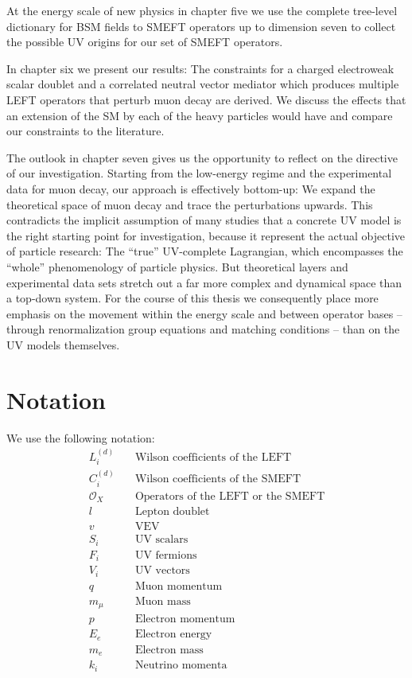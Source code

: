 At the energy scale of new physics in chapter five we use the complete tree-level dictionary for BSM fields to SMEFT operators up to dimension seven to collect the possible UV origins for our set of SMEFT operators. 

In chapter six we present our results: The constraints for a charged electroweak scalar doublet and a correlated neutral vector mediator which produces multiple LEFT operators that perturb muon decay are derived. We discuss the effects that an extension of the SM by each of the heavy particles would have and compare our constraints to the literature.

The outlook in chapter seven gives us the opportunity to reflect on the directive of our investigation. Starting from the low-energy regime and the experimental data for muon decay, our approach is effectively bottom-up: We expand the theoretical space of muon decay and trace the perturbations upwards. This contradicts the implicit assumption of many studies that a concrete UV model is the right starting point for investigation, because it represent the actual objective of particle research: The \enquote{true} UV-complete Lagrangian, which encompasses the \enquote{whole} phenomenology of particle physics. But theoretical layers and experimental data sets stretch out a far more complex and dynamical space than a top-down system. For the course of this thesis we consequently place more emphasis on the movement within the energy scale and between operator bases -- through renormalization group equations and matching conditions -- than on the UV models themselves. 

\section{Notation}
We use the following notation:
\begin{align}
         L^{(d)}_i &\quad  \text{Wilson coefficients of the LEFT}\\[5pt]
         C^{(d)}_i &\quad  \text{Wilson coefficients of the SMEFT}\\[5pt]
         \mathcal{O}_X &\quad \text{Operators of the LEFT or the SMEFT}\\[5pt]
         l &\quad \text{Lepton doublet}\\[5pt]
         v &\quad \text{VEV}\\[5pt]
         S_i &\quad \text{UV scalars}\\[5pt]
         F_i &\quad \text{UV fermions}\\[5pt]
         V_i &\quad \text{UV vectors}\\[5pt]
         q &\quad \text{Muon momentum}\\[5pt]
         m_\mu &\quad \text{Muon mass}\\[5pt]
         p &\quad \text{Electron momentum}\\[5pt]
         E_e &\quad \text{Electron energy}\\[5pt]
         m_e &\quad \text{Electron mass}\\[5pt]
         k_i &\quad \text{Neutrino momenta}
\end{align}
